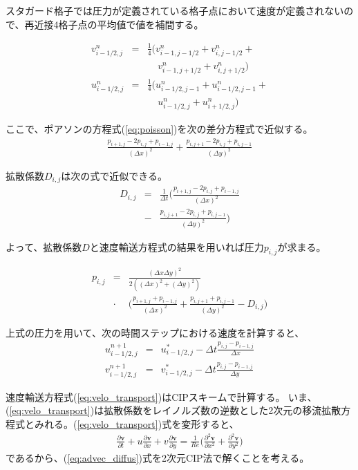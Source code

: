 \documentclass[twocolumn,oneside,a4paper]{article}
\begin{document}
スタガード格子では圧力が定義されている格子点において速度が定義されないので、再近接4格子点の平均値で値を補間する。

\begin{eqnarray*}
 v^n_{i-1/2,j} &=& \frac{1}{4}\bigg(v^n_{i-1,j-1/2}+v^n_{i,j-1/2} +\\
               &&\:\:\:\:\: v^n_{i-1,j+1/2}+v^n_{i,j+1/2}\bigg) \\
 u^n_{i-1/2,j} &=& \frac{1}{4}\bigg(u^n_{i-1/2,j-1}+u^n_{i-1/2,j-1} +\\
               &&\:\:\:\:\: u^n_{i-1/2,j}+u^n_{i+1/2,j}\bigg)
\end{eqnarray*}


ここで、ポアソンの方程式(\ref{eq:poisson})を次の差分方程式で近似する。
\begin{eqnarray*}
	\frac{p_{i+1,j}-2p_{i,j}+p_{i-1,j}}{(\Delta x)^2} + \frac{p_{i,j+1}-2p_{i,j}+p_{i,j-1}}{(\Delta y)^2}
\end{eqnarray*}


拡散係数$D_{i,j}$は次の式で近似できる。
\begin{eqnarray*}
	D_{i,j} &=& \frac{1}{\Delta t}\bigg( \frac{p_{i+1,j}-2p_{i,j}+p_{i-1,j}}{(\Delta x)^2}  \\
	&-& \frac{p_{i,j+1}-2p_{i,j}+p_{i,j-1}}{(\Delta y)^2} \bigg)
\end{eqnarray*}


よって、拡散係数$D$と速度輸送方程式の結果を用いれば圧力$p_{i,j}$が求まる。

\begin{eqnarray*}
	p_{i,j} &=& \frac{(\Delta x \Delta y)^2}{2((\Delta x)^2+(\Delta y)^2)} \\
	&\cdot& \bigg( \frac{p_{i+1,j}+p_{i-1,j}}{(\Delta x)^2} + \frac{p_{i,j+1}+p_{i,j-1}}{(\Delta y)^2} - D_{i,j}\bigg)
\end{eqnarray*}

上式の圧力を用いて、次の時間ステップにおける速度を計算すると、
\begin{eqnarray*}
	u^{n+1}_{i-1/2,j} &=& u^\ast_{i-1/2,j} - \Delta t \frac{p_{i,j}-p_{i-1,j}}{\Delta x} \\
	v^{n+1}_{i-1/2,j} &=& v^\ast_{i-1/2,j} - \Delta t \frac{p_{i,j}-p_{i-1,j}}{\Delta y} 
\end{eqnarray*}

速度輸送方程式(\ref{eq:velo_transport})はCIPスキームで計算する。
いま、(\ref{eq:velo_transport})は拡散係数をレイノルズ数の逆数とした2次元の移流拡散方程式とみれる。(\ref{eq:velo_transport})式を変形すると、
\begin{eqnarray}\label{eq:advec_diffus}
\frac{\partial \bm{v}}{\partial t} + u\frac{\partial \bm{v}}{\partial x} + v\frac{\partial \bm{v}}{\partial y} = \frac{1}{Re} \bigg( \frac{\partial^2 \bm{v}}{\partial x^2} + \frac{\partial^2 \bm{v}}{\partial y^2} \bigg)
\end{eqnarray}
であるから、(\ref{eq:advec_diffus})式を2次元CIP法で解くことを考える。
\end{document}
